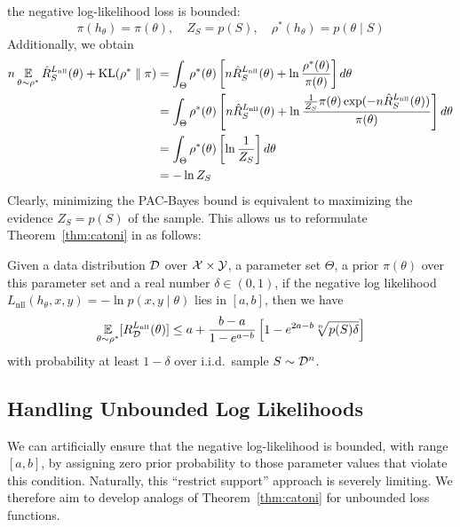 the negative log-likelihood loss is bounded:
\begin{equation}
  \pi(h_\theta) = \pi(\theta), \quad Z_S = p(S), \quad \rho^*(h_\theta) =
  p(\theta \mid S)
\end{equation}
Additionally, we obtain
\begin{equation}
  \begin{split}
    n \operatorname*{\mathbb{E}}_{\theta \sim \rho^*} \hat{R}_S^{L_\text{nll}}(\theta) +
    \text{KL}(\rho^* \parallel \pi)
    &= \int_\Theta \rho^*(\theta) \left[n \hat{R}_S^{L_\text{nll}}(\theta) + \ln
    \frac{\rho^*(\theta)}{\pi(\theta)}\right] d\theta \\
    &= \int_\Theta \rho^*(\theta) \left[n \hat{R}_S^{L_\text{nll}}(\theta) + \ln
    \frac{\frac{1}{Z_S} \pi(\theta) \exp(-n
    \hat{R}_S^{L_\text{nll}}(\theta))}{\pi(\theta)}\right] d\theta \\
    &= \int_\Theta \rho^*(\theta) \left[\ln \frac{1}{Z_S}\right] d\theta \\
    &= -\ln Z_S
  \end{split}
\end{equation}
Clearly, minimizing the PAC-Bayes bound is equivalent to maximizing the evidence
$Z_S = p(S)$ of the sample. This allows us to reformulate
Theorem~\ref{thm:catoni} in as follows:

\begin{corollary}
  \label{cor:catoni}
  Given a data distribution $\mathcal{D}$ over $\mathcal{X} \times \mathcal{Y}$, a parameter set
  $\Theta$, a prior $\pi(\theta)$ over this parameter set and a real number
  $\delta \in (0, 1)$, if the negative log likelihood $L_\text{nll}(h_\theta, x,
  y) = -\ln p(x, y \mid \theta)$ lies in $[a, b]$, then we have
  \begin{equation}
    \operatorname*{\mathbb{E}}_{\theta \sim \rho^*}[R_{\mathcal{D}}^{L_\text{nll}}(\theta)] \leq a + \frac{b -
    a}{1 - e^{a - b}}\left[1 - e^{2 a - b} \sqrt[n]{p(S) \delta}\right]
  \end{equation}
  with probability at least $1 - \delta$ over i.i.d.\ sample $S \sim \mathcal{D}^n$.
\end{corollary}

\subsection{Handling Unbounded Log Likelihoods}

We can artificially ensure that the negative log-likelihood is bounded, with
range $[a, b]$, by assigning zero prior probability to those parameter values
that violate this condition. Naturally, this ``restrict support'' approach is
severely limiting. We therefore aim to develop analogs of
Theorem~\ref{thm:catoni} for unbounded loss functions.

